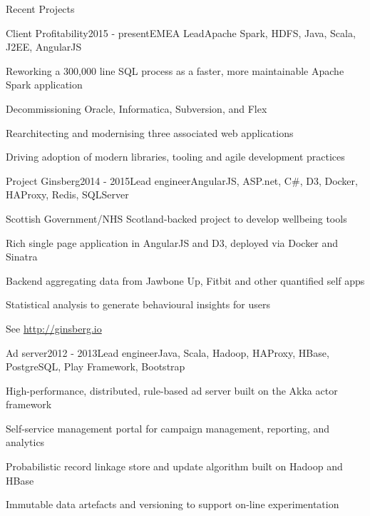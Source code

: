 \documentclass{resume} %
\begin{document}
\begin{rSection}{Recent Projects}

\begin{rSubsection}{Client Profitability}{2015 -  present}{EMEA Lead}{Apache Spark, HDFS, Java, Scala, J2EE, AngularJS}
\item Reworking a 300,000 line SQL process as a faster, more maintainable Apache Spark application
\item Decommissioning Oracle, Informatica, Subversion, and Flex
\item Rearchitecting and modernising three associated web applications
\item Driving adoption of modern libraries, tooling and agile development practices
\end{rSubsection}

\begin{rSubsection}{Project Ginsberg}{2014 - 2015}{Lead engineer}{AngularJS, ASP.net, C\#, D3, Docker, HAProxy, Redis, SQLServer}
\item Scottish Government/NHS Scotland-backed project to develop wellbeing tools
\item Rich single page application in AngularJS and D3, deployed via Docker and Sinatra
\item Backend aggregating data from Jawbone Up, Fitbit and other quantified self apps
\item Statistical analysis to generate behavioural insights for users
\item See \url{http://ginsberg.io}
\end{rSubsection}


\begin{rSubsection}{Ad server}{2012 - 2013}{Lead engineer}{Java, Scala, Hadoop, HAProxy, HBase, PostgreSQL, Play Framework, Bootstrap}
\item High-performance, distributed, rule-based ad server built on the Akka actor framework
\item Self-service management portal for campaign management, reporting, and analytics
\item Probabilistic record linkage store and update algorithm built on Hadoop and HBase
\item Immutable data artefacts and versioning to support on-line experimentation
\end{rSubsection}


\end{rSection}
\end{document}
